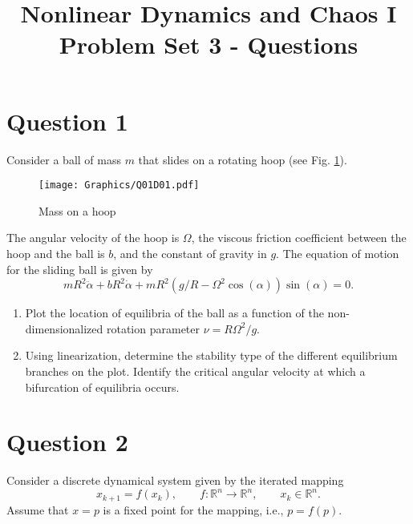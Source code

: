 \documentclass[twoside,10pt,a4paper]{article}
\title{\huge \textbf{Nonlinear Dynamics and Chaos I \\ \Large  Problem Set 3 - Questions}}	%
\author{ }		%
\date{ }	%
\begin{document}
\maketitle

\section*{Question 1}
Consider a ball of mass $m$ that slides on a rotating hoop (see Fig. \ref{Q01D01}).

\begin{figure}[H]
	\centering
	\texttt{[image: Graphics/Q01D01.pdf]}
	\caption{Mass on a hoop}
	\label{Q01D01}
\end{figure}
The angular velocity of the hoop is $\Omega$, the viscous friction coefficient between the hoop and the ball is $b$, and the constant of gravity in $g$. The equation of motion for the sliding ball is given by
\begin{equation*}
	mR^2 \ddot{\alpha} + bR^2 \dot{\alpha} + mR^2(g/R - \Omega^2 \cos(\alpha)) \sin(\alpha) = 0.
\end{equation*}

\begin{enumerate}[label=(\alph*)]
	\item Plot the location of equilibria of the ball as a function of the non-dimensionalized rotation parameter $\nu = R\Omega^2 /g$.
	\item Using linearization, determine the stability type of the different equilibrium branches on the plot. Identify the critical angular velocity at which a bifurcation of equilibria occurs.
\end{enumerate}

\section*{Question 2}
Consider a discrete dynamical system given by the iterated mapping
\begin{equation*}
	x_{k+1} = f(x_k), \qquad f: \mathbb{R}^n \rightarrow \mathbb{R}^n, \qquad x_k \in \mathbb{R}^n.
\end{equation*}
Assume that $x = p$ is a fixed point for the mapping, i.e., $p = f(p)$.
\end{document}
